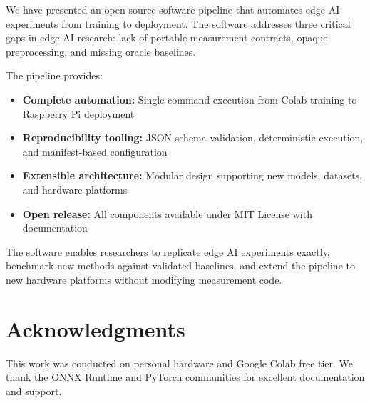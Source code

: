 \documentclass[review]{elsarticle}
\begin{document}
We have presented an open-source software pipeline that automates edge AI experiments from training to deployment. The software addresses three critical gaps in edge AI research: lack of portable measurement contracts, opaque preprocessing, and missing oracle baselines.

The pipeline provides:

\begin{itemize}
\item \textbf{Complete automation:} Single-command execution from Colab training to Raspberry Pi deployment
\item \textbf{Reproducibility tooling:} JSON schema validation, deterministic execution, and manifest-based configuration
\item \textbf{Extensible architecture:} Modular design supporting new models, datasets, and hardware platforms
\item \textbf{Open release:} All components available under MIT License with documentation
\end{itemize}

The software enables researchers to replicate edge AI experiments exactly, benchmark new methods against validated baselines, and extend the pipeline to new hardware platforms without modifying measurement code.

\section*{Acknowledgments}

This work was conducted on personal hardware and Google Colab free tier. We thank the ONNX Runtime and PyTorch communities for excellent documentation and support.
\end{document}
